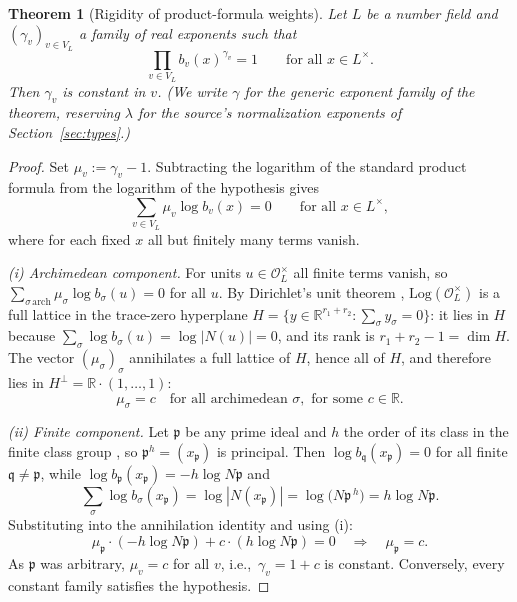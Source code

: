 \documentclass[11pt,a4paper]{article}
\newtheorem{theorem}{Theorem}[section]
\theoremstyle{definition}
\theoremstyle{remark}
\newcommand{\OL}{\mathcal{O}_L}
\begin{document}
\begin{theorem}[Rigidity of product-formula weights]\label{thm:rigidity}
Let $L$ be a number field and $(\gamma_v)_{v \in V_L}$ a family of real
exponents such that
\[
\prod_{v \in V_L} b_v(x)^{\gamma_v} = 1
\qquad \text{for all } x \in L^\times .
\]
Then $\gamma_v$ is constant in $v$. (We write $\gamma$ for the generic
exponent family of the theorem, reserving $\lambda$ for the source's
normalization exponents of Section~\ref{sec:types}.)
\end{theorem}

\begin{proof}
Set $\mu_v := \gamma_v - 1$. Subtracting the logarithm of the standard
product formula from the logarithm of the hypothesis gives
\[
\sum_{v \in V_L} \mu_v \log b_v(x) = 0
\qquad \text{for all } x \in L^\times,
\]
where for each fixed $x$ all but finitely many terms vanish.

\emph{(i) Archimedean component.} For units $u \in \OL^\times$ all finite
terms vanish, so $\sum_{\sigma\,\mathrm{arch}} \mu_\sigma \log b_\sigma(u) = 0$
for all $u$. By Dirichlet's unit theorem \cite[Ch.~I, \S7]{neukirch},
$\mathrm{Log}(\OL^\times)$ is a full lattice in the trace-zero hyperplane
$H = \{ y \in \mathbb{R}^{r_1 + r_2} : \sum_\sigma y_\sigma = 0 \}$: it lies
in $H$ because $\sum_\sigma \log b_\sigma(u) = \log|N(u)| = 0$, and its rank
is $r_1 + r_2 - 1 = \dim H$. The vector $(\mu_\sigma)_\sigma$ annihilates a
full lattice of $H$, hence all of $H$, and therefore lies in
$H^\perp = \mathbb{R}\cdot(1,\dots,1)$:
\[
\mu_\sigma = c \quad \text{for all archimedean } \sigma,
\text{ for some } c \in \mathbb{R}.
\]

\emph{(ii) Finite component.} Let $\mathfrak{p}$ be any prime ideal and $h$
the order of its class in the finite class group
\cite[Ch.~I, \S6]{neukirch}, so $\mathfrak{p}^h = (x_{\mathfrak{p}})$ is
principal. Then $\log b_{\mathfrak{q}}(x_{\mathfrak{p}}) = 0$ for all finite
$\mathfrak{q} \ne \mathfrak{p}$, while
$\log b_{\mathfrak{p}}(x_{\mathfrak{p}}) = -h \log N\mathfrak{p}$ and
\[
\sum_{\sigma} \log b_\sigma(x_{\mathfrak{p}})
= \log|N(x_{\mathfrak{p}})| = \log\bigl(N\mathfrak{p}^{\,h}\bigr)
= h \log N\mathfrak{p} .
\]
Substituting into the annihilation identity and using (i):
\[
\mu_{\mathfrak{p}} \cdot (-h \log N\mathfrak{p})
+ c \cdot (h \log N\mathfrak{p}) = 0
\quad\Longrightarrow\quad
\mu_{\mathfrak{p}} = c .
\]
As $\mathfrak{p}$ was arbitrary, $\mu_v = c$ for all $v$, i.e.,\
$\gamma_v = 1 + c$ is constant. Conversely, every constant family satisfies
the hypothesis.
\end{proof}
\end{document}
